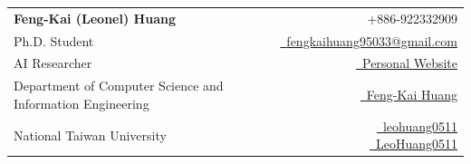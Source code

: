 \documentclass[a4paper,11pt]{article}
\begin{document}
\selectfont


\parbox{\dimexpr\linewidth\relax}{
\begin{tabularx}{\linewidth}{L r}
  \textbf{\Large Feng-Kai (Leonel) Huang} &  {\raisebox{0.0\height}{\footnotesize \faPhone}\ +886-922332909} \\
  {Ph.D. Student} &  \href{mailto:leohuang0511@gmail.com}{\raisebox{0.0\height}{\footnotesize \faEnvelope}\ {fengkaihuang95033@gmail.com}}\\
  {AI Researcher} &  \href{https://leohuang0511.github.io/}{\raisebox{0.0\height}{\footnotesize \faGlobe}\ {Personal Website}}\\
  {Department of Computer Science and Information Engineering} & \href{https://scholar.google.com/citations?user=QlZ9PvYAAAAJ\&hl=zh-TW}{\raisebox{0.0\height}{\footnotesize \faGraduationCap}\ {Feng-Kai Huang}} \\
  {National Taiwan University} &  \href{https://www.linkedin.com/in/leohuang0511}{\raisebox{0.0\height}{\footnotesize \faLinkedin}\ {leohuang0511}} \ \href{https://github.com/LeoHuang0511}{\raisebox{0.0\height}{\footnotesize \faGithub}\ {LeoHuang0511}}
\end{tabularx}
}

















\end{document}
